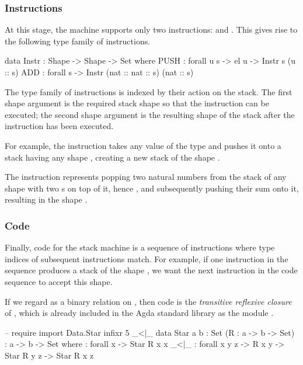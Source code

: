 \subsubsection{Instructions}

At this stage, the machine supports only two instructions: 
and . This gives rise to the following type family of instructions.
\begin{code}
  data Instr : Shape -> Shape -> Set where
    PUSH : forall {u s} -> el u -> Instr s (u :: s)
    ADD : forall {s} -> Instr (nat :: nat :: s) (nat :: s)
\end{code}
The type family of instructions is indexed by their action on the stack. The first shape
argument is the required stack shape so that the instruction can be executed;
the second shape argument is the resulting shape of the stack after the
instruction has been executed.

For example, the instruction  takes any value of the type 
and pushes it onto a stack having any shape , creating a new
stack of the shape .

The instruction  represents popping two natural numbers from the
stack of any shape with two s on top of it, hence
,
and subsequently pushing their sum onto it, resulting in the shape
.

\subsubsection{Code}

Finally, code for the stack machine is a sequence of instructions where
type indices of subsequent instructions match. For example, if one instruction
in the sequence produces a stack of the shape ,
we want the next instruction in the code sequence to accept this shape.

If we regard
as a binary relation on , then code is the \emph{transitive reflexive closure}
of , which is already included in the Agda standard library as the
module .

\begin{code}
  -- require import Data.Star
  infixr 5 _<|\_
  data Star {a b : Set} (R : a -> b -> Set) : a -> b -> Set where
    \nil : forall {x} -> Star R x x
    _<|\_ : forall {x y z} -> R x y -> Star R y z -> Star R x z
\end{code}


